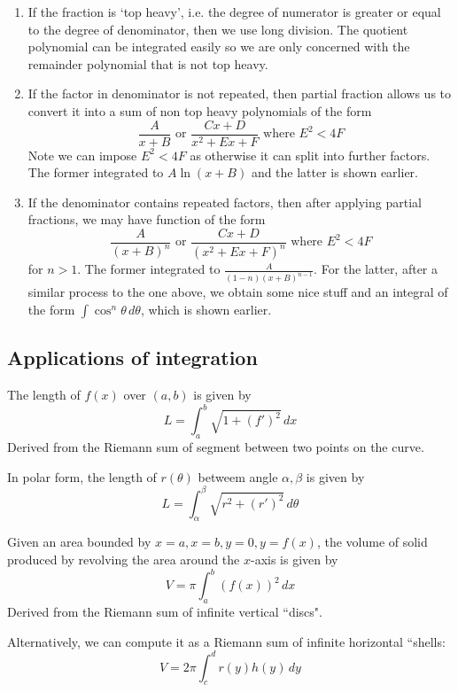 \documentclass[11pt]{article}
\begin{document}
\begin{algorithm}
  \begin{enumerate}
    \item If the fraction is `top heavy', i.e. the degree of numerator is greater or equal to the degree of denominator, then we use long division. The quotient polynomial can be integrated easily so we are only concerned with the remainder polynomial that is not top heavy.
    \item If the factor in denominator is not repeated, then partial fraction allows us to convert it into a sum of non top heavy polynomials of the form
    \[\frac{A}{x+B} \text{ or } \frac{Cx+D}{x^2+Ex+F} \text{ where } E^2<4F\]
    Note we can impose \(E^2<4F\) as otherwise it can split into further factors. The former integrated to \(A\ln(x+B)\) and the latter is shown earlier.
    \item If the denominator contains repeated factors, then after applying partial fractions, we may have function of the form
    \[\frac{A}{(x+B)^n}\text{ or } \frac{Cx+D}{(x^2+Ex+F)^n} \text{ where } E^2<4F\]
    for \(n>1\). The former integrated to \(\frac{A}{(1-n)(x+B)^{n-1}}\). For the latter, after a similar process to the one above, we obtain some nice stuff and an integral of the form \(\int \cos^n\theta \,d\theta\), which is shown earlier.
  \end{enumerate}
\end{algorithm}

\subsection{Applications of integration}

\begin{theorem}
  The length of \(f(x)\) over \((a,b)\) is given by
  \[L=\int_a^b\sqrt{1+(f')^2}\,dx\]
  Derived from the Riemann sum of segment between two points on the curve.

  In polar form, the length of \(r(\theta)\) betweem angle \(\alpha,\beta\) is given by
  \[L=\int_{\alpha}^{\beta}\sqrt{r^2+(r')^2}\,d\theta\]
\end{theorem}

\begin{theorem}
  Given an area bounded by \(x=a,x=b,y=0,y=f(x)\), the volume of solid produced by revolving the area around the \(x\)-axis is given by \[V=\pi\int_{a}^{b}(f(x))^2\,dx\]
  Derived from the Riemann sum of infinite vertical ``discs".

  Alternatively, we can compute it as a Riemann sum of infinite horizontal ``shells:
  \[V=2\pi\int_{c}^{d}r(y)h(y)\,dy\]
\end{theorem}
\end{document}
